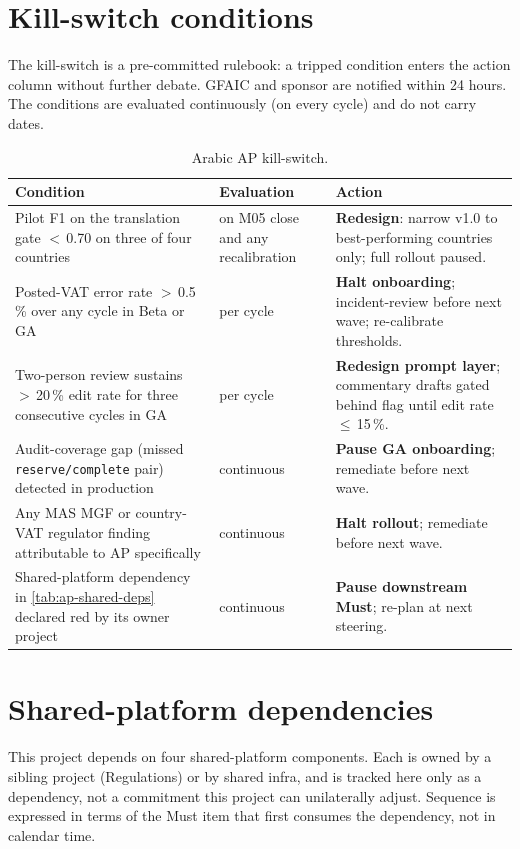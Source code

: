 \documentclass[11pt,a4paper,twoside]{report}
\begin{document}
\section{Kill-switch conditions}\label{sec:ap-kill-switch}

The kill-switch is a pre-committed rulebook: a tripped condition enters
the action column without further debate. GFAIC and sponsor are
notified within 24 hours. The conditions are evaluated continuously
(on every cycle) and do not carry dates.

\begin{table}[htbp]
\centering
\caption{Arabic AP kill-switch.}
\label{tab:ap-kill-switch}
\footnotesize
\begin{tabularx}{\linewidth}{@{}l l X@{}}
\toprule
\textbf{Condition} & \textbf{Evaluation} & \textbf{Action} \\ \midrule
Pilot F1 on the translation gate $<$\,0.70 on three of four countries & on M05 close and any recalibration & \textbf{Redesign}: narrow v1.0 to best-performing countries only; full rollout paused. \\
Posted-VAT error rate $>$\,0.5\,\% over any cycle in Beta or GA & per cycle & \textbf{Halt onboarding}; incident-review before next wave; re-calibrate thresholds. \\
Two-person review sustains $>$\,20\,\% edit rate for three consecutive cycles in GA & per cycle & \textbf{Redesign prompt layer}; commentary drafts gated behind flag until edit rate $\le$\,15\,\%. \\
Audit-coverage gap (missed \texttt{reserve/complete} pair) detected in production & continuous & \textbf{Pause GA onboarding}; remediate before next wave. \\
Any MAS MGF or country-VAT regulator finding attributable to AP specifically & continuous & \textbf{Halt rollout}; remediate before next wave. \\
Shared-platform dependency in \cref{tab:ap-shared-deps} declared red by its owner project & continuous & \textbf{Pause downstream Must}; re-plan at next steering. \\
\bottomrule
\end{tabularx}
\end{table}

\section{Shared-platform dependencies}\label{sec:ap-shared-deps}

This project depends on four shared-platform components. Each is owned
by a sibling project (Regulations) or by shared infra, and is tracked
here only as a dependency, not a commitment this project can
unilaterally adjust. Sequence is expressed in terms of the Must item
that first consumes the dependency, not in calendar time.
\end{document}
